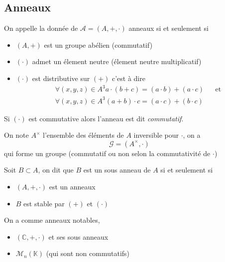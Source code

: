 \documentclass[11pt,colorlinks]{book}
\theoremstyle{mytheoremstyle}
\theoremstyle{mytheoremstyle}
\theoremstyle{mytheoremstyle}
\theoremstyle{mytheoremstyle}
\theoremstyle{mytheoremstyle}
\theoremstyle{mytheoremstyle}
\theoremstyle{mytheoremstyle}
\theoremstyle{mytheoremstyle}
\theoremstyle{myproblemstyle}
\def\mbb#1{\mathbb{#1}}
\def\bC{\mbb{C}}
\def\bK{\mbb{K}}
\begin{document}
\subsection{Anneaux}
\begin{definition}
  On appelle la donnée de $\mathcal A = (A,+,\cdot)$ anneaux si et seulement si 
  \begin{itemize}
    \item $(A,+)$ est un groupe abélien (commutatif)
    \item $(\cdot)$ admet un élement neutre (élement neutre multiplicatif)
    \item $(\cdot)$ est distributive sur $(+)$ c'est à dire
    \begin{align*}
      &\forall (x,y,z) \in A^3 a \cdot (b+c) = (a \cdot b) + (a \cdot c) && \text{et} \\ 
      &\forall (x,y,z) \in A^3 (a+b) \cdot c = (a \cdot c) + (b \cdot c)
    \end{align*}
  \end{itemize}
\end{definition}
\begin{rmq}
  Si $(\cdot)$ est commutative alors l'anneau est dit \textit{commutatif}.
\end{rmq}
\begin{definition}
  On note $A^{\times}$ l'ensemble des éléments de $A$ inversible pour $\cdot$, on a 
  \begin{equation*}
    \mathcal G = (A^{\times},\cdot)
  \end{equation*}
  qui forme un groupe (commutatif ou non selon la commutativité de $\cdot$)
\end{definition}
\begin{definition}
  Soit $B \subset A$, on dit que $B$ est un sous anneau de $A$ si et seulement si 
  \begin{itemize}
    \item $(A,+,\cdot)$ est un anneaux
    \item $B$ est stable par $(+)$ et $(\cdot)$
  \end{itemize}
\end{definition}
\begin{ex}
  On a comme anneaux notables,
  \begin{itemize}
    \item $(\bC,+,\cdot)$ et ses sous anneaux 
    \item $\mathcal{M}_{n}(\bK)$ (qui sont non commutatifs)
  \end{itemize}
\end{ex}
\end{document}
